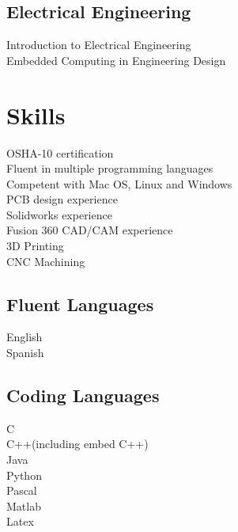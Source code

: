 \documentclass[]{deedy-resume-openfont}
\begin{document}
\begin{minipage}[t]{0.33\textwidth}
\subsection{Electrical Engineering}
Introduction to Electrical Engineering\\
Embedded Computing in Engineering Design
\sectionsep
\section{Skills}
OSHA-10 certification\\
Fluent in multiple programming languages\\
Competent with Mac OS, Linux and Windows\\
PCB design experience\\
Solidworks experience\\
Fusion 360 CAD/CAM experience\\
3D Printing\\
CNC Machining
\sectionsep
\subsection{Fluent Languages}
English\\
Spanish
\sectionsep
\subsection{Coding Languages}
C\\
C++(including embed C++)\\
Java\\
Python\\
Pascal\\
Matlab\\
Latex
\sectionsep
%
%

\end{minipage} 
\hfill
\end{document}
